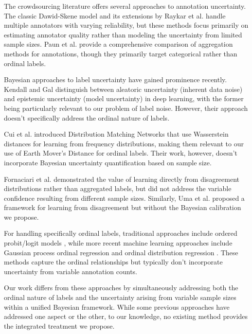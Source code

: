 \documentclass[journal]{IEEEtran}
\begin{document}
The crowdsourcing literature offers several approaches to annotation uncertainty. The classic Dawid-Skene model \cite{dawid1979} and its extensions by Raykar et al. \cite{raykar2010} handle multiple annotators with varying reliability, but these methods focus primarily on estimating annotator quality rather than modeling the uncertainty from limited sample sizes. Paun et al. \cite{paun2018} provide a comprehensive comparison of aggregation methods for annotations, though they primarily target categorical rather than ordinal labels.

Bayesian approaches to label uncertainty have gained prominence recently. Kendall and Gal \cite{kendall2017} distinguish between aleatoric uncertainty (inherent data noise) and epistemic uncertainty (model uncertainty) in deep learning, with the former being particularly relevant to our problem of label noise. However, their approach doesn't specifically address the ordinal nature of labels.

Cui et al. \cite{cui2020} introduced Distribution Matching Networks that use Wasserstein distances for learning from frequency distributions, making them relevant to our use of Earth Mover's Distance for ordinal labels. Their work, however, doesn't incorporate Bayesian uncertainty quantification based on sample size.

Fornaciari et al. \cite{fornaciari2021} demonstrated the value of learning directly from disagreement distributions rather than aggregated labels, but did not address the variable confidence resulting from different sample sizes. Similarly, Uma et al. \cite{uma2021} proposed a framework for learning from disagreement but without the Bayesian calibration we propose.

For handling specifically ordinal labels, traditional approaches include ordered probit/logit models \cite{mccullagh1980}, while more recent machine learning approaches include Gaussian process ordinal regression \cite{chu2005} and ordinal distribution regression \cite{seeger2021}. These methods capture the ordinal relationships but typically don't incorporate uncertainty from variable annotation counts.

Our work differs from these approaches by simultaneously addressing both the ordinal nature of labels and the uncertainty arising from variable sample sizes within a unified Bayesian framework. While some previous approaches have addressed one aspect or the other, to our knowledge, no existing method provides the integrated treatment we propose.
\end{document}
